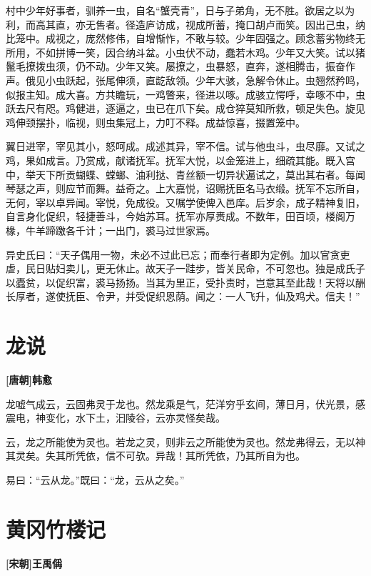 \documentclass[UTF8,titlepage,oneside]{ctexbook}
\begin{document}
村中少年好事者，驯养一虫，自名“蟹壳青”，日与子弟角，无不胜。欲居之以为利，而高其直，亦无售者。径造庐访成，视成所蓄，掩口胡卢而笑。因出己虫，纳比笼中。成视之，庞然修伟，自增惭怍，不敢与较。少年固强之。顾念蓄劣物终无所用，不如拼博一笑，因合纳斗盆。小虫伏不动，蠢若木鸡。少年又大笑。试以猪鬣毛撩拨虫须，仍不动。少年又笑。屡撩之，虫暴怒，直奔，遂相腾击，振奋作声。俄见小虫跃起，张尾伸须，直龁敌领。少年大骇，急解令休止。虫翘然矜鸣，似报主知。成大喜。方共瞻玩，一鸡瞥来，径进以啄。成骇立愕呼，幸啄不中，虫跃去尺有咫。鸡健进，逐逼之，虫已在爪下矣。成仓猝莫知所救，顿足失色。旋见鸡伸颈摆扑，临视，则虫集冠上，力叮不释。成益惊喜，掇置笼中。

翼日进宰，宰见其小，怒呵成。成述其异，宰不信。试与他虫斗，虫尽靡。又试之鸡，果如成言。乃赏成，献诸抚军。抚军大悦，以金笼进上，细疏其能。既入宫中，举天下所贡蝴蝶、螳螂、油利挞、青丝额一切异状遍试之，莫出其右者。每闻琴瑟之声，则应节而舞。益奇之。上大嘉悦，诏赐抚臣名马衣缎。抚军不忘所自，无何，宰以卓异闻。宰悦，免成役。又嘱学使俾入邑庠。后岁余，成子精神复旧，自言身化促织，轻捷善斗，今始苏耳。抚军亦厚赉成。不数年，田百顷，楼阁万椽，牛羊蹄躈各千计；一出门，裘马过世家焉。

异史氏曰：“天子偶用一物，未必不过此已忘；而奉行者即为定例。加以官贪吏虐，民日贴妇卖儿，更无休止。故天子一跬步，皆关民命，不可忽也。独是成氏子以蠹贫，以促织富，裘马扬扬。当其为里正，受扑责时，岂意其至此哉！天将以酬长厚者，遂使抚臣、令尹，并受促织恩荫。闻之：一人飞升，仙及鸡犬。信夫！”


\chapter*{龙说}
\begin{center}
	\textbf{[唐朝]韩愈}
\end{center}

龙嘘气成云，云固弗灵于龙也。然龙乘是气，茫洋穷乎玄间，薄日月，伏光景，感震电，神变化，水下土，汩陵谷，云亦灵怪矣哉。


云，龙之所能使为灵也。若龙之灵，则非云之所能使为灵也。然龙弗得云，无以神其灵矣。失其所凭依，信不可欤。异哉！其所凭依，乃其所自为也。


易曰：“云从龙。”既曰：“龙，云从之矣。”





\chapter*{黄冈竹楼记}
\begin{center}
	\textbf{[宋朝]王禹偁}
\end{center}
\end{document}
